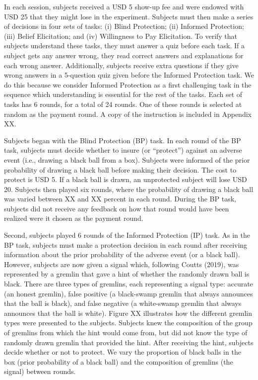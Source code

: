 \documentclass[12pt,a4paper]{article}
\begin{document}
In each session, subjects received a USD 5 show-up fee and were endowed with USD 25 that they might lose in the experiment. Subjects must then make a series of decisions in four sets of tasks: (i) Blind Protection; (ii) Informed Protection; (iii) Belief Elicitation; and (iv) Willingness to Pay Elicitation. To verify that subjects understand these tasks, they must answer a quiz before each task. If a subject gets any answer wrong, they read correct answers and explanations for each wrong answer. Additionally, subjects receive extra questions if they give wrong answers in a 5-question quiz given before the Informed Protection task. We do this because we consider Informed Protection as a first challenging task in the sequence which understanding is essential for the rest of the tasks. 
Each set of tasks has 6 rounds, for a total of 24 rounds. One of these rounds is selected at random as the payment round. A copy of the instruction is included in Appendix XX.

Subjects began with the Blind Protection (BP) task. In each round of the BP task, subjects must decide whether to insure (or “protect”) against an adverse event (i.e., drawing a black ball from a box).  Subjects were informed of the prior probability of drawing a black ball before making their decision. The cost to protect is USD 5. If a black ball is drawn, an unprotected subject will lose USD 20. Subjects then played six rounds, where the probability of drawing a black ball was varied between XX and XX percent in each round. During the BP task, subjects did not receive any feedback on how that round would have been realized were it chosen as the payment round.

Second, subjects played 6 rounds of the Informed Protection (IP) task. As in the BP task, subjects must make a protection decision in each round after receiving information about the prior probability of the adverse event (or a black ball). However, subjects are now given a signal which, following Coutts (2019), was represented by a gremlin that gave a hint of whether the randomly drawn ball is black. There are three types of gremlins, each representing a signal type: accurate (an honest gremlin), false positive (a black-swamp gremlin that always announces that the ball is black), and false negative (a white-swamp gremlin that always announces that the ball is white). Figure XX illustrates how the different gremlin types were presented to the subjects. Subjects knew the composition of the group of gremlins from which the hint would come from, but did not know the type of randomly drawn gremlin that provided the hint. After receiving the hint, subjects decide whether or not to protect. We vary the proportion of black balls in the box (prior probability of a black ball) and the composition of gremlins (the signal) between rounds.  
\end{document}

